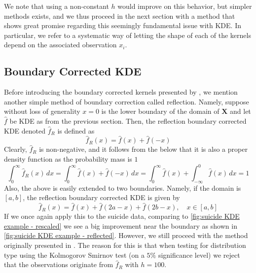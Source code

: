 \documentclass[../Thesis.tex]{subfiles}
\begin{document}
We note that using a non-constant $h$ would improve on this behavior, but simpler methods exists, and we thus proceed in the next section with a method that shows great promise regarding this seemingly fundamental issue with KDE. In particular, we refer to a systematic way of letting the shape of each of the kernels depend on the associated observation $x_i$.


\newpage
\subsection{Boundary Corrected KDE}\label{sec:Boundary corrected KDE}
Before introducing the boundary corrected kernels presented by \cite{Jones1993SimpleBC}, we mention another simple method of boundary correction called reflection. Namely, suppose without loss of generality $x = 0$ is the lower boundary of the domain of $\boldsymbol X$ and let $\hat{f}$ be KDE as from the previous section. Then, the reflection boundary corrected KDE denoted $\hat{f}_R$ is defined as
$$\hat{f}_R(x) = \hat{f}(x) + \hat{f}(-x)$$
Clearly, $\hat{f}_R$ is non-negative, and it follows from the below that it is also a proper density function as the probability mass is $1$
$$\int_{0}^{\infty} \hat{f}_R \left(x\right) \, dx = \int_{0}^{\infty} \hat{f} \left(x\right) + \hat{f} \left(-x\right) \, dx = \int_{0}^{\infty} \hat{f} \left(x\right) + \int_{-\infty}^{0}\hat{f} \left(x\right) \, dx = 1$$
Also, the above is easily extended to two boundaries. Namely, if the domain is $[a,b]$, the reflection boundary corrected KDE is given by
$$\hat{f}_R\left(x\right) = \hat{f}\left(x\right) + \hat{f}\left(2a-x\right) + \hat{f}\left(2b-x\right),\quad x \in [a,b]$$
If we once again apply this to the suicide data, comparing to \autoref{fig:suicide KDE example - rescaled} we see a big improvement near the boundary as shown in \autoref{fig:suicide KDE example - reflected}. However, we still proceed with the method originally presented in \cite{Jones1993SimpleBC}. The reason for this is that when testing for distribution type using the Kolmogorov Smirnov test (on a $5\%$ significance level) we reject that the observations originate from $\hat{f}_R$ with $h = 100$.
\end{document}
